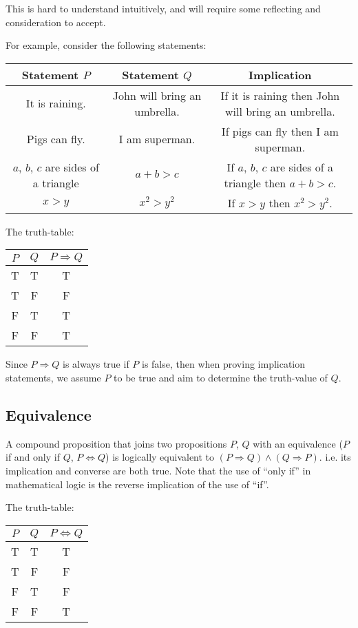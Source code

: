 \documentclass[11pt, a4paper, oneside]{exam}
\theoremstyle{definition}\newtheorem{define}{Definition}[section]
\theoremstyle{remark}\newtheorem{remark}{Remark}
\theoremstyle{definition}\newtheorem{example}{Example}[subsection]
\theoremstyle{definition}\newtheorem{notation}{Notation}[section]
\theoremstyle{definition}\newtheorem{theorem}{Theorem}[section]
\theoremstyle{definition}\newtheorem{corollary}{Corollary}[section]
\begin{document}
This is hard to understand intuitively, and will require some reflecting and consideration to accept.

For example, consider the following statements:

\begin{center}
	\small
	\begin{tabular}{c|c|c}
		Statement $P$ & Statement $Q$ & Implication\\ \hline
		It is raining. & John will bring an umbrella. & If it is raining then John will bring an umbrella.\\
		Pigs can fly. & I am superman. & If pigs can fly then I am superman.\\
		$a$, $b$, $c$ are sides of a triangle & $a + b > c$ & If $a$, $b$, $c$ are sides of a triangle then $a+b > c$.\\
		$x > y$ & $x^2 > y^2$ & If $x>y$ then $x^2 > y^2$.
	\end{tabular}
\end{center}

The truth-table:

\begin{center}
	\begin{tabular}{|c|c|c|}\hline
		$P$ & $Q$ & $P \Rightarrow Q$\\ \hline
		T & T & T\\
		T & F & F\\
		F & T & T\\
		F & F & T\\ \hline
	\end{tabular}
\end{center}

Since $P \Rightarrow Q$ is always true if $P$ is false, then when proving implication statements, we assume $P$ to be true and aim to determine the truth-value of $Q$. 


\subsection{Equivalence}

A compound proposition that joins two propositions $P$, $Q$ with an equivalence ($P$ if and only if $Q$, $P \Leftrightarrow Q$) is logically equivalent to $(P \Rightarrow Q) \land (Q \Rightarrow P)$. i.e. its implication and converse are both true. Note that the use of ``only if'' in mathematical logic is the reverse implication of the use of ``if''.

The truth-table:

\begin{center}
	\begin{tabular}{|c|c|c|}\hline
		$P$ & $Q$ & $P \Leftrightarrow Q$\\ \hline
		T & T & T\\
		T & F & F\\
		F & T & F\\
		F & F & T\\ \hline
	\end{tabular}
\end{center}
\end{document}

